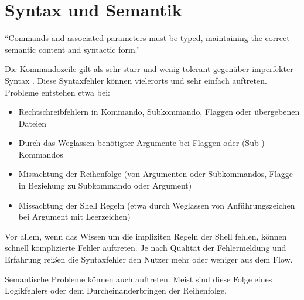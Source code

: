 \documentclass[oneside,bibliography=totocnumbered,BCOR=5mm]{scrbook}
\newenvironment{code}{\captionsetup{type=listing, skip=0pt}}{}
\begin{document}
\section{Syntax und Semantik}

``Commands and associated parameters must be typed, maintaining the correct
semantic content and syntactic form.'' \parencite[184]{Westerman_1997}

\bigskip

\newcommand{\refss}[1]{\hyperref[prob:ss]{#1}}

\bigskip

Die Kommandozeile gilt als sehr starr und wenig tolerant gegenüber imperfekter
Syntax \parencite{Gentner_1996}. Diese Syntaxfehler können vielerorts und sehr
einfach auftreten. Probleme entstehen etwa bei:

\begin{itemize}
  \item Rechtschreibfehlern in Kommando, Subkommando, Flaggen oder übergebenen Dateien
  \item Durch das Weglassen benötigter Argumente bei Flaggen oder (Sub-) Kommandos
  \item Missachtung der Reihenfolge (von Argumenten oder Subkommandos, Flagge in Beziehung zu Subkommando oder Argument)
  \item Missachtung der Shell Regeln (etwa durch Weglassen von Anführungszeichen bei Argument mit Leerzeichen)
\end{itemize}

Vor allem, wenn das Wissen um die impliziten Regeln der Shell fehlen, können
schnell komplizierte Fehler auftreten. Je nach Qualität der Fehlermeldung und
Erfahrung reißen die Syntaxfehler den Nutzer mehr oder weniger aus dem Flow.

\begin{code}
  \medskip
\end{code}

\bigskip

Semantische Probleme können auch auftreten. Meist sind diese Folge eines
Logikfehlers oder dem Durcheinanderbringen der Reihenfolge.
\end{document}
